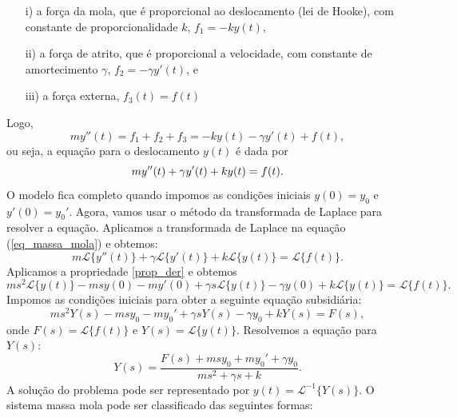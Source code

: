 \begin{itemize}
 \item[i)] a força da mola, que é proporcional ao deslocamento (lei de Hooke), com constante de proporcionalidade $k$, $f_1=-k y(t)$,
 \item[ii)] a força de atrito, que é proporcional a velocidade, com constante de amortecimento $\gamma$, $f_2=-\gamma y'(t)$, e
 \item[iii)] a força externa, $f_3(t)=f(t)$
\end{itemize}
Logo,
\begin{equation}
my''(t)=f_1+f_2+f_3=-ky(t)-\gamma y'(t)+f(t),
\end{equation}
ou seja, a equação para o deslocamento $y(t)$ é dada por
\begin{equation}{\label{eq_massa_mola}}
my''(t)+\gamma y'(t)+ky(t)=f(t).
\end{equation}
O modelo fica completo quando impomos as condições iniciais $y(0)=y_0$ e $y'(0)=y_0'$.
Agora, vamos usar o método da transformada de Laplace para resolver a equação. Aplicamos a transformada de Laplace na equação (\ref{eq_massa_mola}) e obtemos:
\begin{equation}
m\mathcal{L}\{y''(t)\}+\gamma \mathcal{L}\{y'(t)\}+k\mathcal{L}\{y(t)\}=\mathcal{L}\{f(t)\}.
\end{equation}
Aplicamos a propriedade \ref{prop_der} e obtemos
\begin{equation}
ms^2\mathcal{L}\{y(t)\}-msy(0)-my'(0)+\gamma s\mathcal{L}\{y(t)\}-\gamma y(0)+k\mathcal{L}\{y(t)\}=\mathcal{L}\{f(t)\}.
\end{equation}
Impomos as condições iniciais para obter a seguinte equação subsidiária:
\begin{equation}
ms^2Y(s)-msy_0-my_0'+\gamma sY(s)-\gamma y_0+kY(s)=F(s),
\end{equation}
onde $F(s)=\mathcal{L}\{f(t)\}$ e $Y(s)=\mathcal{L}\{y(t)\}$. Resolvemos a equação para $Y(s)$:
\begin{equation}
Y(s)=\frac{F(s)+msy_0+my_0'+\gamma y_0}{ms^2+\gamma s +k}.
\end{equation}
A solução do problema pode ser representado por $y(t)=\mathcal{L}^{-1}\{Y(s)\}$.
O sistema massa mola pode ser classificado das seguintes formas:

